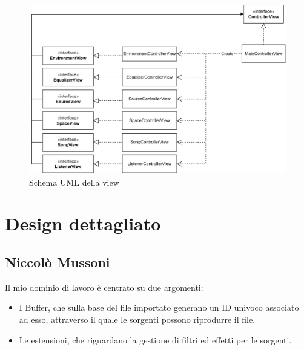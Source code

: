 \documentclass[a4paper,12pt]{report}
\begin{document}
\begin{figure}[H]
\centering{}
\includegraphics[width=\textwidth]{img/architecture/view.png}
\caption{Schema UML della view}
\label{img:analysis}
\end{figure}

\section{Design dettagliato}
\subsection*{Niccolò Mussoni}
Il mio dominio di lavoro è centrato su due argomenti:
\begin{itemize}
	\item I Buffer, che sulla base del file importato generano un ID univoco associato ad esso, attraverso il quale le sorgenti possono riprodurre il file. 
	\item Le estensioni, che riguardano la gestione di filtri ed effetti per le sorgenti.
\end{itemize}
\end{document}
